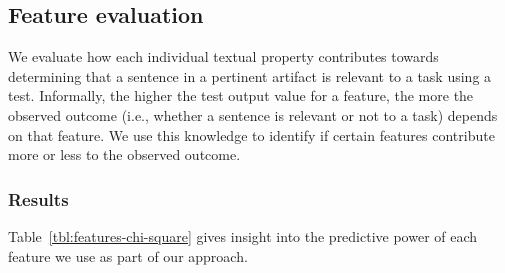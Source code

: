 \subsection{Feature evaluation}


We evaluate how each individual textual property contributes towards determining 
that a sentence in a pertinent artifact is relevant to a task 
using a  test. 
Informally, the higher the test output value for a feature, the more the observed outcome (i.e., whether a sentence is relevant or not to a task) depends 
on that feature.
We use this knowledge to identify if certain features contribute more or less 
to the observed outcome.





\subsubsection{Results}



Table~\ref{tbl:features-chi-square} gives insight into the predictive power of each feature we use as part of our approach. 













